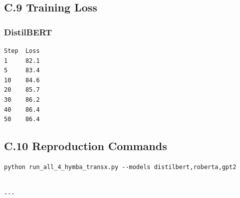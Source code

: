 \subsection{C.9 Training Loss}

\subsubsection{DistilBERT}
\begin{lstlisting}
Step  Loss
1     82.1
5     83.4
10    84.6
20    85.7
30    86.2
40    86.4
50    86.4
\end{lstlisting}

\subsection{C.10 Reproduction Commands}

\begin{lstlisting}
python run_all_4_hymba_transx.py --models distilbert,roberta,gpt2
\end{lstlisting}
\begin{lstlisting}

---
\end{lstlisting}